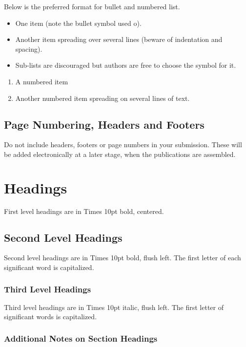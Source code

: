 \documentclass{article}
\begin{document}
Below is the preferred format for bullet and numbered list.

\begin{itemize}\itemsep0pt %
\item One item (note the bullet symbol used o).
\item Another item spreading over several lines (beware of indentation and spacing).
\item Sub-lists are discouraged but authors are free to choose the symbol for it.
\end{itemize}

\begin{enumerate}\itemsep0pt
\item A numbered item
\item Another numbered item spreading on several lines of text.
\end{enumerate}


\subsection{Page Numbering, Headers and Footers}

Do not include headers, footers or page numbers in your submission. 
These will be added electronically at a later stage, when the publications are assembled.

\section{Headings}

First level headings are in Times 10pt bold, centered.

\subsection{Second Level Headings}

Second level headings are in Times 10pt bold, flush left.
The first letter of each significant word is capitalized.

\subsubsection{Third Level Headings}

Third level headings are in Times 10pt italic, flush left.
The first letter of significant words is capitalized.

\subsubsection{Additional Notes on Section Headings}
\end{document}
